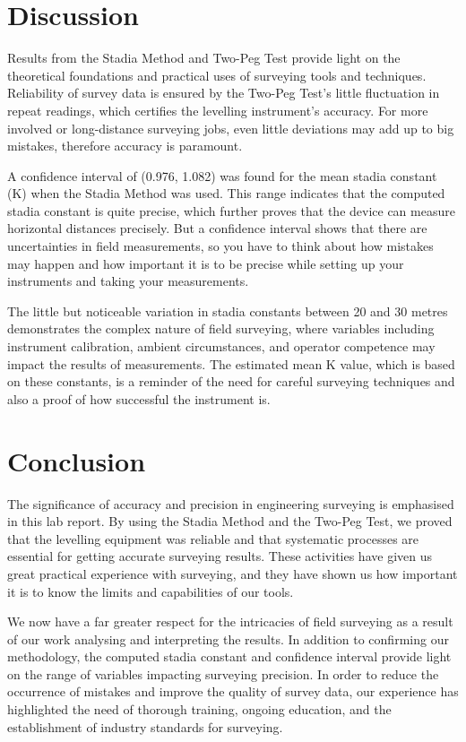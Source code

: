 \documentclass[12pt]{report}
\begin{document}
\newpage
\section*{Discussion}



Results from the Stadia Method and Two-Peg Test provide light on the theoretical foundations and practical uses of surveying tools and techniques. Reliability of survey data is ensured by the Two-Peg Test's little fluctuation in repeat readings, which certifies the levelling instrument's accuracy. For more involved or long-distance surveying jobs, even little deviations may add up to big mistakes, therefore accuracy is paramount.

A confidence interval of (0.976, 1.082) was found for the mean stadia constant (K) when the Stadia Method was used. This range indicates that the computed stadia constant is quite precise, which further proves that the device can measure horizontal distances precisely. But a confidence interval shows that there are uncertainties in field measurements, so you have to think about how mistakes may happen and how important it is to be precise while setting up your instruments and taking your measurements.

The little but noticeable variation in stadia constants between 20 and 30 metres demonstrates the complex nature of field surveying, where variables including instrument calibration, ambient circumstances, and operator competence may impact the results of measurements. The estimated mean K value, which is based on these constants, is a reminder of the need for careful surveying techniques and also a proof of how successful the instrument is.

\section*{Conclusion}

The significance of accuracy and precision in engineering surveying is emphasised in this lab report. By using the Stadia Method and the Two-Peg Test, we proved that the levelling equipment was reliable and that systematic processes are essential for getting accurate surveying results. These activities have given us great practical experience with surveying, and they have shown us how important it is to know the limits and capabilities of our tools.

We now have a far greater respect for the intricacies of field surveying as a result of our work analysing and interpreting the results. In addition to confirming our methodology, the computed stadia constant and confidence interval provide light on the range of variables impacting surveying precision. In order to reduce the occurrence of mistakes and improve the quality of survey data, our experience has highlighted the need of thorough training, ongoing education, and the establishment of industry standards for surveying.
\end{document}
